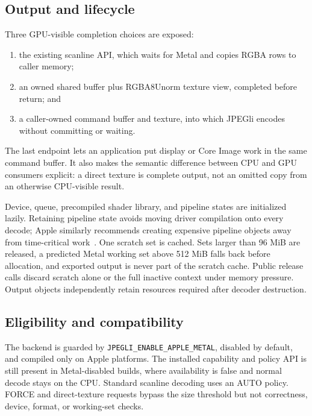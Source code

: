 \documentclass[10pt,twocolumn]{article}
\newcommand{\code}[1]{\texttt{#1}}
\begin{document}
\subsection{Output and lifecycle}

Three GPU-visible completion choices are exposed:

\begin{enumerate}
  \item the existing scanline API, which waits for Metal and copies RGBA rows
        to caller memory;
  \item an owned shared buffer plus RGBA8Unorm texture view, completed before
        return; and
  \item a caller-owned command buffer and texture, into which JPEGli encodes
        without committing or waiting.
\end{enumerate}

The last endpoint lets an application put display or Core Image work in the
same command buffer.  It also makes the semantic difference between CPU and
GPU consumers explicit: a direct texture is complete output, not an omitted
copy from an otherwise CPU-visible result.

Device, queue, precompiled shader library, and pipeline states are initialized
lazily.  Retaining pipeline state avoids moving driver compilation onto every
decode; Apple similarly recommends creating expensive pipeline objects away
from time-critical work~\cite{apple-pipeline-state}.  One scratch set is
cached.  Sets larger than 96 MiB are released, a predicted Metal working set
above 512 MiB falls back before allocation, and exported output is never part
of the scratch cache.  Public release calls discard scratch alone or the full
inactive context under memory pressure.  Output objects independently retain
resources required after decoder destruction.

\subsection{Eligibility and compatibility}

The backend is guarded by \code{JPEGLI\_ENABLE\_APPLE\_METAL}, disabled by
default, and compiled only on Apple platforms.  The installed capability and
policy API is still present in Metal-disabled builds, where availability is
false and normal decode stays on the CPU.  Standard scanline decoding uses an
AUTO policy.  FORCE and direct-texture requests bypass the size threshold but
not correctness, device, format, or working-set checks.
\end{document}
